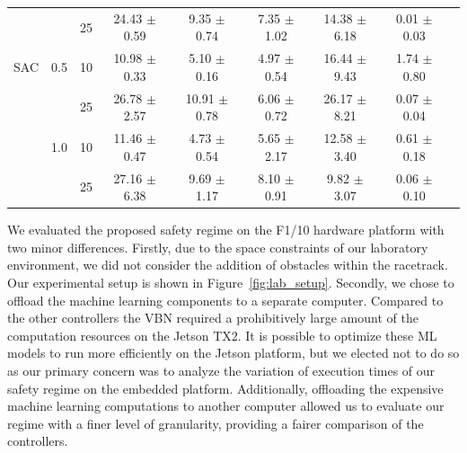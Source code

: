 \documentclass[manuscript,screen,review]{acmart}
\newcommand{\ttj}[1]{\textcolor{red}{\textbf{\underline{TTJ:}} #1}}
\newcommand{\figref}[1]{Figure~\ref{#1}}
\begin{document}
\begin{table}[ht]
{\begin{tabular}{ccccccccc}
    &     & 25 &  24.43 $\pm$   0.59 &    9.35 $\pm$  0.74 &           7.35 $\pm$  1.02 &    14.38 $\pm$  6.18 &                    0.01 $\pm$  0.03 \\
SAC & 0.5 & 10 &  10.98 $\pm$   0.33 &    5.10 $\pm$  0.16 &           4.97 $\pm$  0.54 &    16.44 $\pm$  9.43 &                    1.74 $\pm$  0.80 \\
    &     & 25 &  26.78 $\pm$   2.57 &   10.91 $\pm$  0.78 &           6.06 $\pm$  0.72 &    26.17 $\pm$  8.21 &                    0.07 $\pm$  0.04 \\
    & 1.0 & 10 &  11.46 $\pm$   0.47 &    4.73 $\pm$  0.54 &           5.65 $\pm$  2.17 &    12.58 $\pm$  3.40 &                    0.61 $\pm$  0.18 \\
    &     & 25 &  27.16 $\pm$   6.38 &    9.69 $\pm$  1.17 &           8.10 $\pm$  0.91 &     9.82 $\pm$  3.07 &                    0.06 $\pm$  0.10 \\
\end{tabular}}%
\end{table}


We evaluated the proposed safety regime on the F1/10 hardware platform with two minor differences. Firstly, due to the space constraints of our laboratory environment, we did not consider the addition of obstacles within the racetrack. Our experimental setup is shown in \figref{fig:lab_setup}. Secondly, we chose to offload the machine learning components to a separate computer. Compared to the other controllers the VBN required a prohibitively large amount of the computation resources on the Jetson TX2. It is possible to optimize these ML models to run more efficiently on the Jetson platform, but we elected not to do so as our primary concern was to analyze the variation of execution times of our safety regime on the embedded platform. Additionally, offloading the expensive machine learning computations to another computer allowed us to evaluate our regime with a finer level of granularity, providing a fairer comparison of the controllers.








\end{document}
